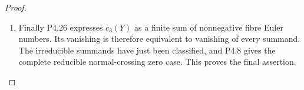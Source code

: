 \begin{proof}
\begin{enumerate}[label={$\langle1\rangle$\arabic*.},leftmargin=*]
\item Finally P4.26 expresses $c_3(Y)$ as a finite sum of
nonnegative fibre Euler numbers. Its vanishing is therefore
equivalent to vanishing of every summand. The irreducible
summands have just been classified, and P4.8 gives the
complete reducible normal-crossing zero case. This proves
the final assertion.

\end{enumerate}
\end{proof}
